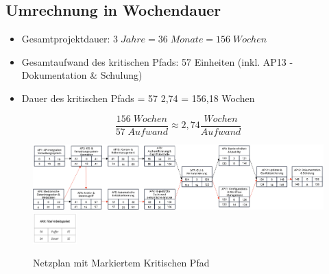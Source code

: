 \subsection{Umrechnung in Wochendauer}
\begin{itemize}
	\item Gesamtprojektdauer: $3 \; Jahre = 36 \; Monate = 156 \; Wochen$
	\item Gesamtaufwand des kritischen Pfads: 57 Einheiten (inkl. AP13 - Dokumentation \& Schulung)
	\item Dauer des kritischen Pfads = 57 2,74 = 156,18 Wochen
\end{itemize}
\[
	\frac{156 \; Wochen}{57 \; Aufwand} \approx 2,74 \frac{Wochen}{Aufwand}
\]
\begin{figure}[ht]
	\centering
	\includegraphics[width=1\textwidth]{fig/Netzplan.png}
	\includegraphics[width=0.15\textwidth]{fig/Netzplan info.png}
	\caption{Netzplan mit Markiertem Kritischen Pfad}
	\label{fig:netzplan}
\end{figure}
\pagebreak

